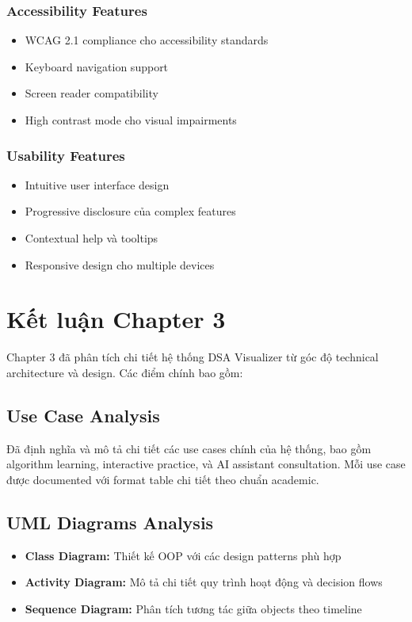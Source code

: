 \subsubsection{Accessibility Features}
\begin{itemize}
    \item WCAG 2.1 compliance cho accessibility standards
    \item Keyboard navigation support
    \item Screen reader compatibility
    \item High contrast mode cho visual impairments
\end{itemize}

\subsubsection{Usability Features}
\begin{itemize}
    \item Intuitive user interface design
    \item Progressive disclosure của complex features
    \item Contextual help và tooltips
    \item Responsive design cho multiple devices
\end{itemize}

\section{Kết luận Chapter 3}
\label{sec:chapter3-conclusion}

Chapter 3 đã phân tích chi tiết hệ thống DSA Visualizer từ góc độ technical architecture và design. Các điểm chính bao gồm:

\subsection{Use Case Analysis}
Đã định nghĩa và mô tả chi tiết các use cases chính của hệ thống, bao gồm algorithm learning, interactive practice, và AI assistant consultation. Mỗi use case được documented với format table chi tiết theo chuẩn academic.

\subsection{UML Diagrams Analysis}
\begin{itemize}
    \item \textbf{Class Diagram:} Thiết kế OOP với các design patterns phù hợp
    \item \textbf{Activity Diagram:} Mô tả chi tiết quy trình hoạt động và decision flows
    \item \textbf{Sequence Diagram:} Phân tích tương tác giữa objects theo timeline
\end{itemize}

